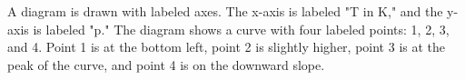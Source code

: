A diagram is drawn with labeled axes. The x-axis is labeled "T in K," and the y-axis is labeled "p." The diagram shows a curve with four labeled points: 1, 2, 3, and 4. Point 1 is at the bottom left, point 2 is slightly higher, point 3 is at the peak of the curve, and point 4 is on the downward slope.
